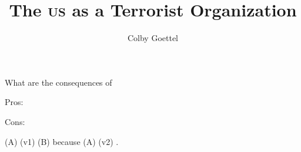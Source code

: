 \documentclass[12pt]{article}
\title{The \textsc{us} as a Terrorist Organization}
\author{Colby Goettel}
\begin{document}
\maketitle





What are the consequences of 

Pros: 

Cons: 

 (A) \uline{} (v1)  (B) because  (A) \uline{} (v2) .

\end{document}
